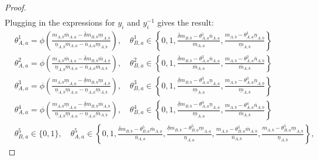 \documentclass[letterpaper]{article} %
\begin{document}
\begin{proof}
\begin{align*}
\end{align*}
Plugging in the expressions for $y_i$ and $y_i^{-1}$ gives the result:
\begin{align*}
    &\theta_{A,a}^1 = \phi\left( \frac{m_{A,b}\overline{m}_{A,a} - \overline{\delta}m_{B,b}\underline{m}_{A,b}}
    {\underline{n}_{A,b}\overline{m}_{A,a} - \overline{n}_{A,a}\underline{m}_{A,b}} \right), \quad
    \theta_{B,a}^1 \in \left\{0, 1, \frac{\overline{\delta} m_{B,b} - \theta_{A,a}^1\overline{n}_{A,a}}{\overline{m}_{A,a}}, \frac{m_{A,b} - \theta_{A,a}^1\underline{n}_{A,b}}{\underline{m}_{A,b}}\right\} \\
    &\theta_{A,a}^2 = \phi\left( \frac{m_{A,b}\overline{m}_{A,a} - \overline{\delta}m_{B,b}\overline{m}_{A,b}}
    {\underline{n}_{A,b}\overline{m}_{A,a} - \overline{n}_{A,a}\overline{m}_{A,b}}\right), \quad
    \theta_{B,a}^2 \in \left\{0, 1, \frac{\overline{\delta} m_{B,b} - \theta_{A,a}^2\overline{n}_{A,a}}{\overline{m}_{A,a}}, \frac{m_{A,b} - \theta_{A,a}^2 \overline{n}_{A,b}}{\overline{m}_{A,b}}\right\} \\
    &\theta_{A,a}^3 = \phi\left( \frac{m_{A,b}\underline{m}_{A,a} - \underline{\delta}m_{B,b}\underline{m}_{A,b}}
    {\underline{n}_{A,b}\underline{m}_{A,a} - \underline{n}_{A,a}\underline{m}_{A,b}}\right), \quad
    \theta_{B,a}^3 \in \left\{0, 1, \frac{\underline{\delta}m_{B,b} - \theta_{A,a}^3 \underline{n}_{A,a}}{\underline{m}_{A,a}} , \frac{m_{A,b} - \theta_{A,a}^3\underline{n}_{A,b}}{\underline{m}_{A,b}}\right\}\\
    &\theta_{A,a}^4 = \phi\left( \frac{m_{A,b}\underline{m}_{A,a} - \underline{\delta}m_{B,b}\overline{m}_{A,b}}
    {\underline{n}_{A,b}\underline{m}_{A,a} - \underline{n}_{A,a}\overline{m}_{A,b}} \right), \quad
    \theta_{B,a}^4 \in \left\{0, 1, \frac{\underline{\delta}m_{B,b} - \theta_{A,a}^4 \underline{n}_{A,a}}{\underline{m}_{A,a}} , \frac{m_{A,b} - \theta_{A,a}^4 \overline{n}_{A,b}}{\overline{m}_{A,b}}\right\} \\
    &\theta_{B,a}^5 \in \{0,1\}, \quad
    \theta_{A,a}^5 \in \left\{0, 1, \frac{\overline{\delta}m_{B,b} - \theta_{B,a}^5 \overline{m}_{A,a}}{\overline{n}_{A,a}}, \frac{\underline{\delta}m_{B,b} - \theta_{B,a}^5 \underline{m}_{A,a}}{\underline{n}_{A,a}}, \frac{m_{A,b} - \theta_{B,a}^5 \overline{m}_{A,b}}{\overline{n}_{A,b}}, \frac{m_{A,b} - \theta_{B,a}^5 \underline{m}_{A,b}}{\underline{n}_{A,b}}\right\},
\end{align*}
\normalsize
\end{proof}


\end{document}
